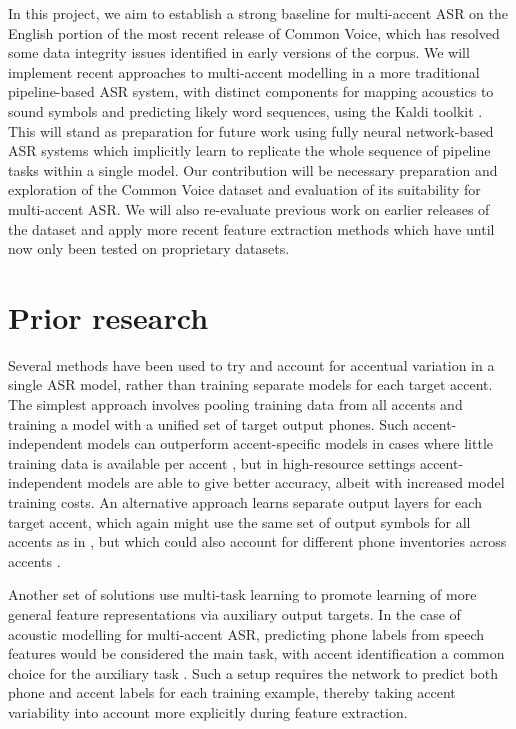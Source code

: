 \documentclass[a4paper]{article}
\begin{document}
In this project, we aim to establish a strong baseline for multi-accent ASR on the English portion of the most recent release of Common Voice, which has resolved some data integrity issues identified in early versions of the corpus.
We will implement recent approaches to multi-accent modelling in a more traditional pipeline-based ASR system, with distinct components for mapping acoustics to sound symbols and predicting likely word sequences, using the Kaldi toolkit \cite{povey2011KaldiSpeechRecognition}.
This will stand as preparation for future work using fully neural network-based ASR systems which implicitly learn to replicate the whole sequence of pipeline tasks within a single model.
Our contribution will be necessary preparation and exploration of the Common Voice dataset and evaluation of its suitability for multi-accent ASR.
We will also re-evaluate previous work on earlier releases of the dataset and apply more recent feature extraction methods which have until now only been tested on proprietary datasets.


\section{Prior research}

Several methods have been used to try and account for accentual variation in a single ASR model, rather than training separate models for each target accent.
The simplest approach involves pooling training data from all accents and training a model with a unified set of target output phones.
Such accent-independent models can outperform accent-specific models in cases where little training data is available per accent \cite{kamper2012MultiaccentAcousticModelling}, but in high-resource settings accent-independent models are able to give better accuracy, albeit with increased model training costs.
An alternative approach learns separate output layers for each target accent, which again might use the same set of output symbols for all accents as in \cite{chen2015ImprovingDeepNeural}, but which could also account for different phone inventories across accents \cite{yang2018JointModelingAccents}.

Another set of solutions use multi-task learning to promote learning of more general feature representations via auxiliary output targets.
In the case of acoustic modelling for multi-accent ASR, predicting phone labels from speech features would be considered the main task, with accent identification a common choice for the auxiliary task \cite{elfeky2016AcousticModelUnification, jain2018ImprovedAccentedSpeech, yang2018JointModelingAccents}.
Such a setup requires the network to predict both phone and accent labels for each training example, thereby taking accent variability into account more explicitly during feature extraction.
\end{document}
